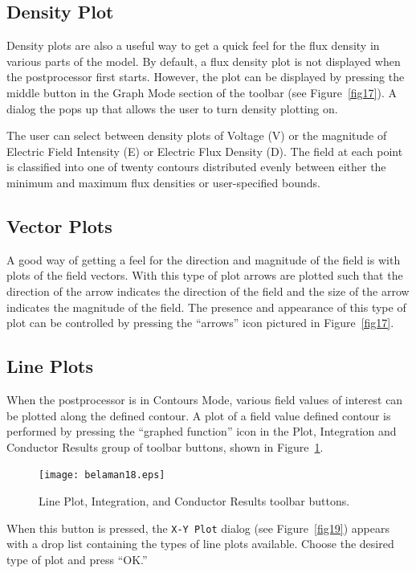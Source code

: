\documentclass[12pt]{report}
\begin{document}
\subsection{Density Plot}

Density plots are also a useful way to get a quick feel for the
flux density in various parts of the model. By default, a flux
density plot is not displayed when the postprocessor first starts.
However, the plot can be displayed by pressing the middle button in
the Graph Mode section of the toolbar (see Figure~\ref{fig17}). A
dialog the pops up that allows the user to turn density plotting
on.

The user can select between density plots of Voltage (V) or the magnitude of
Electric Field Intensity (E) or Electric Flux Density (D). The field at each
point is classified into one of twenty contours distributed evenly between
either the minimum and maximum flux densities or user-specified bounds.

\subsection{Vector Plots}

A good way of getting a feel for the direction and magnitude of the
field is with plots of the field vectors. With this type of plot
arrows are plotted such that the direction of the arrow indicates
the direction of the field and the size of the arrow indicates the
magnitude of the field. The presence and appearance of this type of
plot can be controlled by pressing the ``arrows'' icon pictured in
Figure~\ref{fig17}.

\subsection{Line Plots}

When the postprocessor is in Contours Mode, various field values of
interest can be plotted along the defined contour. A plot of a
field value defined contour is performed by pressing the ``graphed
function'' icon in the Plot, Integration and Conductor Results group of toolbar
buttons, shown in Figure~\ref{fig18}.

\begin{figure}[htbp]
\centerline{\texttt{[image: belaman18.eps]}}
\caption{Line Plot, Integration, and Conductor Results toolbar buttons.}
\label{fig18}
\end{figure}


When this button is pressed, the \texttt{X-Y Plot} dialog (see
Figure~\ref{fig19}) appears with a drop list containing the types
of line plots available. Choose the desired type of plot and press
``OK.''
\end{document}
